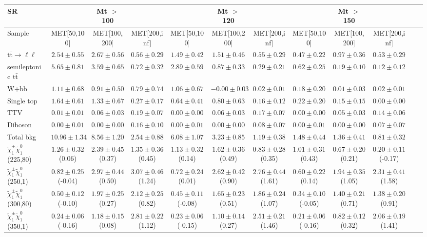 \begin{table}
\begin{center}
\small
\begin{tabular}{lccccccccccc}
\hline
SR & & Mt $>$ 100 & & & Mt $>$ 120 & & &Mt $>$ 150 & & &\\
\hline
Sample&MET[50,100]&MET[100,200]&MET[200,inf]&MET[50,100]&MET[100,200]&MET[200,inf]&MET[50,100]&MET[100,200]&MET[200,inf]&\\
\hline
$\mathrm{t}\bar{\mathrm{t}}\rightarrow \ell\ell$&$2.54\pm0.55$&$2.67\pm0.56$&$0.56\pm0.29$&$1.49\pm0.42$&$1.51\pm0.46$&$0.55\pm0.29$&$0.47\pm0.22$&$0.97\pm0.36$&$0.53\pm0.29$\\
semileptonic $\mathrm{t}\bar{\mathrm{t}}$&$5.65\pm0.81$&$3.59\pm0.65$&$0.72\pm0.32$&$2.89\pm0.59$&$0.87\pm0.33$&$0.29\pm0.21$&$0.62\pm0.25$&$0.19\pm0.10$&$0.12\pm0.12$\\
W+bb&$1.11\pm0.68$&$0.91\pm0.50$&$0.79\pm0.74$&$1.06\pm0.67$&$-0.00\pm0.03$&$0.02\pm0.01$&$0.18\pm0.20$&$0.01\pm0.03$&$0.02\pm0.01$\\
Single top&$1.64\pm0.61$&$1.33\pm0.67$&$0.27\pm0.17$&$0.64\pm0.41$&$0.80\pm0.63$&$0.16\pm0.12$&$0.22\pm0.20$&$0.15\pm0.15$&$0.00\pm0.00$\\
TTV&$0.01\pm0.01$&$0.06\pm0.03$&$0.19\pm0.07$&$0.00\pm0.00$&$0.06\pm0.03$&$0.17\pm0.07$&$0.00\pm0.00$&$0.05\pm0.03$&$0.14\pm0.06$\\
Diboson&$0.00\pm0.01$&$0.00\pm0.00$&$0.16\pm0.10$&$0.00\pm0.01$&$0.00\pm0.00$&$0.08\pm0.07$&$0.00\pm0.01$&$0.00\pm0.00$&$0.07\pm0.07$\\
\hline
Total bkg&$10.96\pm1.34$&$8.56\pm1.20$&$2.54\pm0.88$&$6.08\pm1.07$&$3.23\pm0.85$&$1.19\pm0.38$&$1.48\pm0.44$&$1.36\pm0.41$&$0.81\pm0.32$\\
$\tilde{\chi}_{1}^{\pm}\tilde{\chi}_{1}^{0}$ (225,80)&$1.26\pm0.32$(0.06)&$2.39\pm0.45$(0.37)&$1.35\pm0.36$(0.45)&$1.13\pm0.32$(0.14)&$1.62\pm0.36$(0.49)&$0.83\pm0.28$(0.35)&$1.01\pm0.31$(0.43)&$0.67\pm0.20$(0.21)&$0.20\pm0.11$(-0.17)\\
$\tilde{\chi}_{1}^{\pm}\tilde{\chi}_{1}^{0}$ (250,1)&$0.82\pm0.25$(-0.04)&$2.97\pm0.44$(0.50)&$3.07\pm0.46$(1.24)&$0.72\pm0.24$(0.01)&$2.62\pm0.42$(0.90)&$2.76\pm0.44$(1.61)&$0.60\pm0.22$(0.14)&$1.94\pm0.35$(1.05)&$2.31\pm0.41$(1.58)\\
$\tilde{\chi}_{1}^{\pm}\tilde{\chi}_{1}^{0}$ (300,80)&$0.50\pm0.12$(-0.10)&$1.97\pm0.25$(0.27)&$2.12\pm0.25$(0.82)&$0.45\pm0.11$(-0.08)&$1.65\pm0.23$(0.51)&$1.86\pm0.24$(1.07)&$0.34\pm0.10$(-0.05)&$1.40\pm0.21$(0.71)&$1.38\pm0.20$(0.91)\\
$\tilde{\chi}_{1}^{\pm}\tilde{\chi}_{1}^{0}$ (350,1)&$0.24\pm0.06$(-0.16)&$1.18\pm0.15$(0.08)&$2.81\pm0.22$(1.12)&$0.23\pm0.06$(-0.15)&$1.10\pm0.14$(0.27)&$2.51\pm0.21$(1.46)&$0.21\pm0.06$(-0.16)&$0.82\pm0.12$(0.32)&$2.06\pm0.19$(1.41)\\
\hline
\hline\hline
\end{tabular}
\end{center}
\end{table}

